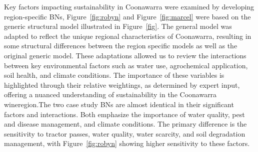 \documentclass[10pt,letterpaper]{article}
\begin{document}
Key factors impacting sustainability in Coonawarra were examined by developing region-specific BNs, Figure~\ref{fig:robyn} and Figure~\ref{fig:marcel} were based on the generic structural model illustrated in Figure~\ref{fig}. The general model was adapted to reflect the unique regional characteristics of Coonawarra, resulting in some structural differences between the region specific models as well as the original generic model. These adaptations allowed us to review the interactions between key environmental factors such as water use, agrochemical application, soil health, and climate conditions. The importance of these variables is highlighted through their relative weightings, as determined by expert input, offering a nuanced understanding of sustainability in the Coonawarra wineregion.The two case study BNs are almost identical in their significant factors and interactions. Both emphasize the importance of water quality, pest and disease management, and climate conditions. The primary difference is the sensitivity to tractor passes, water quality, water scarcity, and soil degradation management, with Figure~\ref{fig:robyn} showing higher sensitivity to these factors. 


\end{document}
